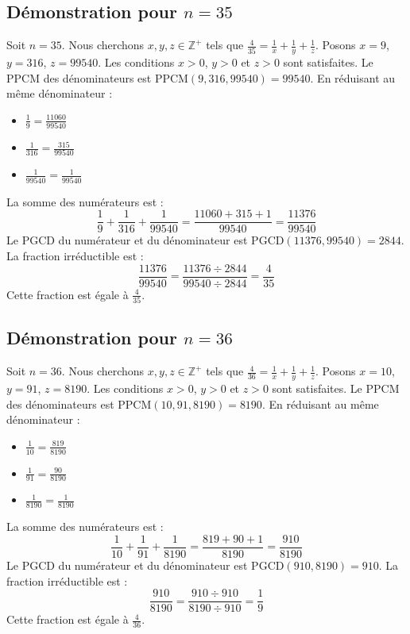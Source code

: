 \documentclass[11pt,a4paper]{article}
\begin{document}
\subsection{Démonstration pour $n = 35$}
Soit $n = 35$. Nous cherchons $x, y, z \in \mathbb{Z}^{+}$ tels que $\frac{4}{35} = \frac{1}{x} + \frac{1}{y} + \frac{1}{z}$.
Posons $x = 9$, $y = 316$, $z = 99540$.
Les conditions $x > 0$, $y > 0$ et $z > 0$ sont satisfaites.
Le PPCM des dénominateurs est $\text{PPCM}(9, 316, 99540) = 99540$.
En réduisant au même dénominateur :
\begin{itemize}
    \item $\frac{1}{9} = \frac{11060}{99540}$
    \item $\frac{1}{316} = \frac{315}{99540}$
    \item $\frac{1}{99540} = \frac{1}{99540}$
\end{itemize}
La somme des numérateurs est :
$$ \frac{1}{9} + \frac{1}{316} + \frac{1}{99540} = \frac{11060 + 315 + 1}{99540} = \frac{11376}{99540} $$
Le PGCD du numérateur et du dénominateur est $\text{PGCD}(11376, 99540) = 2844$.
La fraction irréductible est :
$$ \frac{11376}{99540} = \frac{11376 \div 2844}{99540 \div 2844} = \frac{4}{35} $$
Cette fraction est égale à $\frac{4}{35}$.

\subsection{Démonstration pour $n = 36$}
Soit $n = 36$. Nous cherchons $x, y, z \in \mathbb{Z}^{+}$ tels que $\frac{4}{36} = \frac{1}{x} + \frac{1}{y} + \frac{1}{z}$.
Posons $x = 10$, $y = 91$, $z = 8190$.
Les conditions $x > 0$, $y > 0$ et $z > 0$ sont satisfaites.
Le PPCM des dénominateurs est $\text{PPCM}(10, 91, 8190) = 8190$.
En réduisant au même dénominateur :
\begin{itemize}
    \item $\frac{1}{10} = \frac{819}{8190}$
    \item $\frac{1}{91} = \frac{90}{8190}$
    \item $\frac{1}{8190} = \frac{1}{8190}$
\end{itemize}
La somme des numérateurs est :
$$ \frac{1}{10} + \frac{1}{91} + \frac{1}{8190} = \frac{819 + 90 + 1}{8190} = \frac{910}{8190} $$
Le PGCD du numérateur et du dénominateur est $\text{PGCD}(910, 8190) = 910$.
La fraction irréductible est :
$$ \frac{910}{8190} = \frac{910 \div 910}{8190 \div 910} = \frac{1}{9} $$
Cette fraction est égale à $\frac{4}{36}$.
\end{document}
